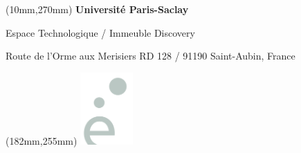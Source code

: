 \begin{singlespace}
\begin{center}
\end{center}

\vspace*{0mm}

\begin{center}
\end{center}

\begin{textblock*}{161mm}(10mm,270mm)
\color{bordeau}
{\bf\noindent Université Paris-Saclay	         }

\noindent Espace Technologique / Immeuble Discovery 

\noindent Route de l’Orme aux Merisiers RD 128 / 91190 Saint-Aubin, France 
\end{textblock*}

\begin{textblock*}{0mm}(182mm,255mm)
\includegraphics[width=20mm]{UPSACLAY-petit}
\end{textblock*}
\end{singlespace}